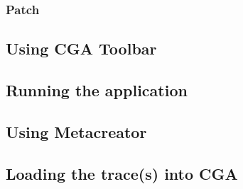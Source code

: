 \subsubsection{Patch}

\subsection{Using CGA Toolbar}

\subsection{Running the application}

\subsection{Using Metacreator}

\subsection{Loading the trace(s) into CGA} 
